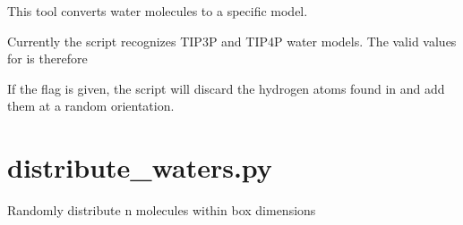 \documentclass[letterpaper,10pt,english]{sphinxmanual}
\begin{document}

%
\begin{sphinxVerbatim}[commandchars=\\\{\}]
  
    
   
\end{sphinxVerbatim}


This tool converts water molecules to a specific model.

Currently the script recognizes TIP3P and TIP4P water models. The valid values for  is therefore 

If the  flag is given, the script will discard the hydrogen atoms found in  and add them at a random orientation.


\section{distribute\_waters.py}
\label{\detokenize{tools:distribute-waters-py}}

Randomly distribute n molecules within box dimensions


%
\begin{sphinxVerbatim}[commandchars=\\\{\}]
  \PYG{p}{[}\PYG{p}{]} \PYG{p}{[}      \PYG{p}{]} \PYG{p}{[} \PYG{p}{]}
                            \PYG{p}{[} \PYG{p}{]} \PYG{p}{[} \PYG{p}{]} \PYG{p}{[} \PYG{p}{]}
                            \PYG{p}{[} \PYG{p}{]} \PYG{p}{[} \PYG{p}{]}
\end{sphinxVerbatim}
\end{document}

